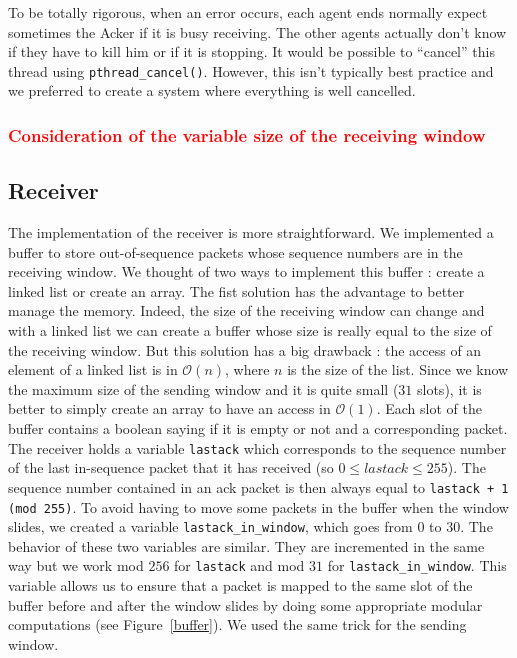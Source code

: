 \documentclass[11pt,a4paper]{article}
\begin{document}
To be totally rigorous, when an error occurs, each agent ends normally expect sometimes the Acker if it is busy receiving. The other agents actually don't know if they have to kill him or if it is stopping. It would be possible to ``cancel'' this thread using \texttt{pthread\_cancel()}. However, this isn't typically best practice and we preferred to create a system where everything is well cancelled.

\subsubsection{\textcolor{red}{Consideration of the variable size of the receiving window}}

\subsection{Receiver}
The implementation of the receiver is more straightforward. We implemented a buffer to store out-of-sequence packets whose sequence numbers are in the receiving window. We thought of two ways to implement this buffer : create a linked list or create an array. The fist solution has the advantage to better manage the memory. Indeed, the size of the receiving window can change and with a linked list we can create a buffer whose size is really equal to the size of the receiving window. But this solution has a big drawback : the access of an element of a linked list is in $\mathcal{O}(n)$, where $n$ is the size of the list. Since we know the maximum size of the sending window and it is quite small ($31$ slots), it is better to simply create an array to have an access in $\mathcal{O}(1)$. Each slot of the buffer contains a boolean saying if it is empty or not and a corresponding packet. The receiver holds a variable \texttt{lastack} which corresponds to the sequence number of the last in-sequence packet that it has received (so $0 \leq lastack \leq 255$). The sequence number contained in an ack packet is then always equal to \texttt{lastack + 1 (mod 255)}. To avoid having to move some packets in the buffer when the window slides, we created a variable \texttt{lastack\_in\_window}, which goes from $0$ to $30$. The behavior of these two variables are similar. They are incremented in the same way but we work mod $256$ for \texttt{lastack} and mod $31$ for \texttt{lastack\_in\_window}. This variable allows us to ensure that a packet is mapped to the same slot of the buffer before and after the window slides by doing some appropriate modular computations (see Figure~\ref{buffer}).  We used the same trick for the sending window.\\
\end{document}
